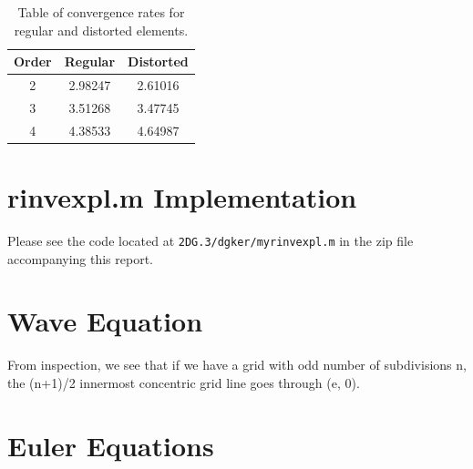 \documentclass{article}
\begin{document}
\begin{table}[!ht]
\centering
\caption{Table of convergence rates for regular and distorted elements.}
\label{tbl:cc}
\begin{tabular}{c c c}
Order & Regular & Distorted \\
\midrule
2 & 2.98247 & 2.61016\\
3 & 3.51268 & 3.47745 \\
4 & 4.38533 & 4.64987 \\
\end{tabular}
\end{table}

\section{rinvexpl.m Implementation}
Please see the code located at \texttt{2DG.3/dgker/myrinvexpl.m} in the zip file accompanying this report.

\section{Wave Equation}
From inspection, we see that if we have a grid with odd number of subdivisions n, the (n+1)/2 innermost concentric grid line goes through (e, 0).

\section{Euler Equations}
\end{document}
